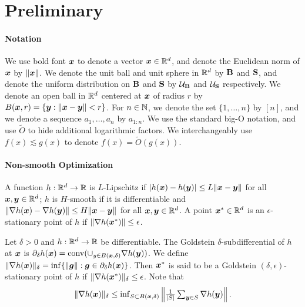 \section{Preliminary}
\label{sec:DP-O2NC_pre}

\paragraph{Notation}

We use bold font ${\boldsymbol{x}}$ to denote a vector ${\boldsymbol{x}}\in\mathbb R^d$, and denote the Euclidean norm of ${\boldsymbol{x}}$ by $\|{\boldsymbol{x}}\|$. We denote the unit ball and unit sphere in $\mathbb R^d$ by ${\mathbf{B}}$ and ${\mathbf{S}}$, and denote the uniform distribution on ${\mathbf{B}}$ and ${\mathbf{S}}$ by ${\cal U}_{\mathbf{B}}$ and ${\cal U}_{\mathbf{S}}$ respectively. We denote an open ball in $\mathbb R^d$ centered at ${\boldsymbol{x}}$ of radius $r$ by $B({\boldsymbol{x}},r)=\{{\boldsymbol{y}}:\|{\boldsymbol{x}}-{\boldsymbol{y}}\|<r\}$. For $n\in\mathbb N$, we denote the set $\{1,\ldots,n\}$ by $[n]$, and we denote a sequence $a_1,\ldots,a_n$ by $a_{1:n}$. We use the standard big-O notation, and use $\tilde O$ to hide additional logarithmic factors. We interchangeably use $f(x)\lesssim g(x)$ to denote $f(x) = \tilde O(g(x))$.


\paragraph{Non-smooth Optimization}

A function $h:\mathbb R^d\to\mathbb R$ is $L$-Lipschitz if $|h({\boldsymbol{x}})-h({\boldsymbol{y}})| \le L\|{\boldsymbol{x}}-{\boldsymbol{y}}\|$ for all ${\boldsymbol{x}},{\boldsymbol{y}}\in\mathbb R^d$; $h$ is $H$-smooth if it is differentiable and $\|\nabla h({\boldsymbol{x}}) - \nabla h({\boldsymbol{y}})\| \le H\|{\boldsymbol{x}}-{\boldsymbol{y}}\|$ for all ${\boldsymbol{x}},{\boldsymbol{y}}\in\mathbb R^d$. A point ${\boldsymbol{x}}^*\in\mathbb R^d$ is an $\epsilon$-stationary point of $h$ if $\|\nabla h({\boldsymbol{x}}^*)\| \le \epsilon$. 

\begin{definition}
\label{def:DP-O2NC:stationary}
Let $\delta>0$ and $h:\mathbb R^d\to\mathbb R$ be differentiable. The Goldstein $\delta$-subdifferential of $h$ at ${\boldsymbol{x}}$ is $\partial_\delta h({\boldsymbol{x}}) = \operatorname{conv}(\cup_{y\in B({\boldsymbol{x}},\delta)} \nabla h({\boldsymbol{y}}))$. We define $\|\nabla h({\boldsymbol{x}})\|_\delta = \inf \{\|{\boldsymbol{g}}\|: {\boldsymbol{g}}\in\partial_\delta h({\boldsymbol{x}})\}$. 
Then ${\boldsymbol{x}}^*$ is said to be a Goldstein $(\delta,\epsilon)$-stationary point of $h$ if $\|\nabla h({\boldsymbol{x}}^*)\|_\delta \le \epsilon$. Note that
\begin{equation*}
    \textstyle
    \|\nabla h({\boldsymbol{x}})\|_\delta \le 
    \inf_{S\subset B({\boldsymbol{x}},\delta)} \left\| \frac{1}{|S|} \sum_{{\boldsymbol{y}}\in S} \nabla h({\boldsymbol{y}}) \right\|.
\end{equation*}
\end{definition}


